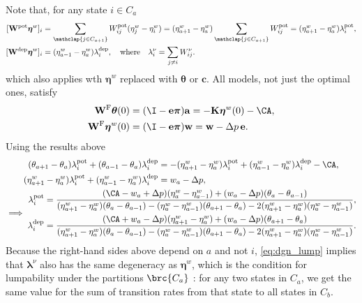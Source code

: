 \documentclass[12pt]{article}
\newcommand{\onev}{\mathbf{e}}
\newcommand{\eqm}{\pi}
\newcommand{\eq}{\boldsymbol{\eqm}}
\newcommand{\etwm}{\eta^w}
\newcommand{\etw}{\boldsymbol{\eta}^w}
\newcommand{\thbm}{\theta}
\newcommand{\thb}{\boldsymbol{\thbm}}
\newcommand{\wm}{w}
\newcommand{\w}{\mathbf{\wm}}
\newcommand{\Wm}{W}
\newcommand{\W}{\mathbf{\Wm}}
\newcommand{\encm}{K}
\newcommand{\enc}{\mathbf{\encm}}
\newcommand{\frg}{\W^{\mathrm{F}}}
\newcommand{\pot}{^{\text{pot}}}
\newcommand{\dep}{^{\text{dep}}}
\begin{document}
Note that, for any state \(i \in C_a\)
%
\begin{equation*}
\begin{aligned}
  [\W\pot \etw]_i &= \sum_{\mathclap{j \in C_{a+1}}} \Wm\pot_{ij} (\etwm_j - \etwm_i)
    = (\etwm_{a+1} - \etwm_a) \sum_{\mathclap{j \in C_{a+1}}} \Wm\pot_{ij}
    = (\etwm_{a+1} - \etwm_a) \lambda\pot_i, \\
  [\W\dep \etw]_i &= (\etwm_{a-1} - \etwm_a) \lambda\dep_i,
  \quad\text{where} \quad
  \lambda^\nu_i =  \sum_{j \neq i} \Wm^\nu_{ij}.
\end{aligned}
\end{equation*}
%
which also applies wth \(\etw\) replaced with \(\thb\) or \(\mathbf{c}\).
All models, not just the optimal ones, satisfy
%
\begin{equation*}
\begin{aligned}
  \frg \thb(0) &= (\I - \onev \eq) \mathbf{a} = - \enc \etw(0) - \CA,
  \\
  \frg \etw(0) &= (\I - \onev \eq) \w = \w - \Delta p\, \onev.
\end{aligned}
\end{equation*}
%
Using the results above
%
\begin{equation}\label{eq:dgn_lump}
\begin{gathered}
\begin{aligned}
  (\thbm_{a+1} - \thbm_a) \lambda\pot_i + (\thbm_{a-1} - \thbm_a) \lambda\dep_i
    &= - (\etwm_{a+1} - \etwm_a) \lambda\pot_i + (\etwm_{a-1} - \etwm_a) \lambda\dep_i - \CA,
  \\
  (\etwm_{a+1} - \etwm_a) \lambda\pot_i + (\etwm_{a-1} - \etwm_a) \lambda\dep_i &= \wm_a - \Delta p,
\end{aligned}
\\
  \implies
\begin{aligned}
  \lambda\pot_i &= \frac{(\CA - \wm_a + \Delta p) (\etwm_a - \etwm_{a-1}) 
                        + (\wm_a - \Delta p) (\thbm_a - \thbm_{a-1})}
                      {(\etwm_{a+1} - \etwm_a) (\thbm_a - \thbm_{a-1})
                        - (\etwm_a - \etwm_{a-1}) (\thbm_{a+1} - \thbm_a)
                        - 2 (\etwm_{a+1} - \etwm_a) (\etwm_a - \etwm_{a-1})}, \\
  \lambda\dep_i &= \frac{(\CA + \wm_a - \Delta p) (\etwm_{a+1} - \etwm_a) 
                        + (\wm_a - \Delta p) (\thbm_{a+1} - \thbm_a)}
                      {(\etwm_{a+1} - \etwm_a) (\thbm_a - \thbm_{a-1})
                        - (\etwm_a - \etwm_{a-1}) (\thbm_{a+1} - \thbm_a)
                        - 2 (\etwm_{a+1} - \etwm_a) (\etwm_a - \etwm_{a-1})}.
\end{aligned}
\end{gathered}
\end{equation}
%
Because the right-hand sides above depend on \(a\) and not \(i\), \cref{eq:dgn_lump} implies that \(\boldsymbol{\lambda}^\nu\) also has the same degeneracy as \(\etw\), which is the condition for lumpability under the partitions \(\brc{C_a}\) \cite{kemeny1960finite,Ball1993Lumpability,burke1958markovian}:
for any two states in \(C_a\), we get the same value for the sum of transition rates from that state to all states in \(C_b\).
\end{document}
